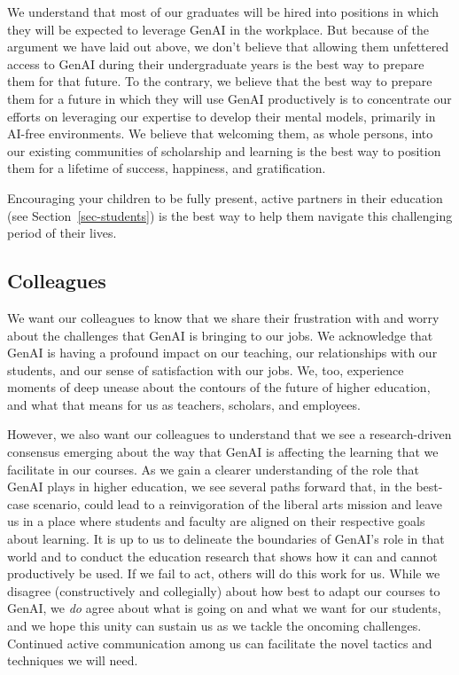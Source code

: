 \documentclass[
]{hdsr}
\begin{document}
We understand that most of our graduates will be hired into positions in
which they will be expected to leverage GenAI in the workplace. But
because of the argument we have laid out above, we don't believe that
allowing them unfettered access to GenAI during their undergraduate
years is the best way to prepare them for that future. To the contrary,
we believe that the best way to prepare them for a future in which they
will use GenAI productively is to concentrate our efforts on leveraging
our expertise to develop their mental models, primarily in AI-free
environments. We believe that welcoming them, as whole persons, into our
existing communities of scholarship and learning is the best way to
position them for a lifetime of success, happiness, and gratification.

Encouraging your children to be fully present, active partners in their
education (see Section~\ref{sec-students}) is the best way to help them
navigate this challenging period of their lives.

\subsection{Colleagues}\label{colleagues}

We want our colleagues to know that we share their frustration with and
worry about the challenges that GenAI is bringing to our jobs. We
acknowledge that GenAI is having a profound impact on our teaching, our
relationships with our students, and our sense of satisfaction with our
jobs. We, too, experience moments of deep unease about the contours of
the future of higher education, and what that means for us as teachers,
scholars, and employees.

However, we also want our colleagues to understand that we see a
research-driven consensus emerging about the way that GenAI is affecting
the learning that we facilitate in our courses. As we gain a clearer
understanding of the role that GenAI plays in higher education, we see
several paths forward that, in the best-case scenario, could lead to a
reinvigoration of the liberal arts mission and leave us in a place where
students and faculty are aligned on their respective goals about
learning. It is up to us to delineate the boundaries of GenAI's role in
that world and to conduct the education research that shows how it can
and cannot productively be used. If we fail to act, others will do this
work for us. While we disagree (constructively and collegially) about
how best to adapt our courses to GenAI, we \emph{do} agree about what is
going on and what we want for our students, and we hope this unity can
sustain us as we tackle the oncoming challenges. Continued active
communication among us can facilitate the novel tactics and techniques
we will need.
\end{document}
